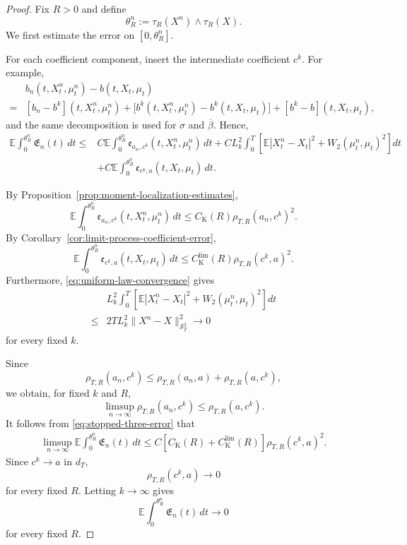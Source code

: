 \documentclass[12pt,oneside, reqno]{amsart}
\numberwithin{equation}{section}
\begin{document}
	\begin{proof}
		Fix $R>0$ and define
		\[
		\theta_R^n
		:=
		\tau_R(X^n)\wedge\tau_R(X).
		\]
		We first estimate the error on $[0,\theta_R^n]$.
		
		For each coefficient component, insert the intermediate coefficient
		$c^k$. For example,
		\[
		\begin{aligned}
			&
			b_n(t,X_t^n,\mu_t^n)-b(t,X_t,\mu_t)\\
			=&[b_n-b^k](t,X_t^n,\mu_t^n)+\bigl[	b^k(t,X_t^n,\mu_t^n)
			-b^k(t,X_t,\mu_t)\bigr]
			+[b^k-b](t,X_t,\mu_t),
		\end{aligned}
		\]
		and the same decomposition is used for $\sigma$ and
		$\overline\beta$. Hence,
		\begin{align}
			\mathbb E\int_0^{\theta_R^n}
			\mathfrak E_n(t)\,dt\leq&
			C\mathbb E\int_0^{\theta_R^n}
			\mathfrak e_{a_n,c^k}(t,X_t^n,\mu_t^n)\,dt
			+
			C L_k^2
			\int_0^T
			\left[
			\mathbb E|X_t^n-X_t|^2
			+
			W_2(\mu_t^n,\mu_t)^2
			\right]dt
			\nonumber\\
			&+
			C\mathbb E\int_0^{\theta_R^n}
			\mathfrak e_{c^k,a}(t,X_t,\mu_t)\,dt.
			\label{eq:stopped-three-error}
		\end{align}
		
		By Proposition~\ref{prop:moment-localization-estimates},
		\[
		\mathbb E\int_0^{\theta_R^n}
		\mathfrak e_{a_n,c^k}(t,X_t^n,\mu_t^n)\,dt
		\leq
		C_{\mathrm K}(R)
		\rho_{T,R}(a_n,c^k)^2.
		\]
		By Corollary~\ref{cor:limit-process-coefficient-error},
		\[
		\mathbb E\int_0^{\theta_R^n}
		\mathfrak e_{c^k,a}(t,X_t,\mu_t)\,dt
		\leq
		C_{\mathrm K}^{\mathrm{lim}}(R)
		\rho_{T,R}(c^k,a)^2.
		\]
		Furthermore, \eqref{eq:uniform-law-convergence} gives
		\[
		\begin{aligned}
			&
			L_k^2
			\int_0^T
			\left[
			\mathbb E|X_t^n-X_t|^2
			+
			W_2(\mu_t^n,\mu_t)^2
			\right]dt
			\\
			\leq&
			2TL_k^2
			\|X^n-X\|_{\mathcal S_T^2}^2
			\longrightarrow0
		\end{aligned}
		\]
		for every fixed $k$.
		
		Since
		\[
		\rho_{T,R}(a_n,c^k)
		\leq
		\rho_{T,R}(a_n,a)
		+
		\rho_{T,R}(a,c^k),
		\]
		we obtain, for fixed $k$ and $R$,
		\[
		\limsup_{n\to\infty}
		\rho_{T,R}(a_n,c^k)
		\leq
		\rho_{T,R}(a,c^k).
		\]
		It follows from \eqref{eq:stopped-three-error} that
		\[
		\begin{aligned}
			\limsup_{n\to\infty}
			\mathbb E\int_0^{\theta_R^n}
			\mathfrak E_n(t)\,dt
			\leq
			C\left[
			C_{\mathrm K}(R)
			+
			C_{\mathrm K}^{\mathrm{lim}}(R)
			\right]
			\rho_{T,R}(c^k,a)^2.
		\end{aligned}
		\]
		Since $c^k\to a$ in $d_T$,
		\[
		\rho_{T,R}(c^k,a)\longrightarrow0
		\]
		for every fixed $R$. Letting $k\to\infty$ gives
		\begin{equation}
			\label{eq:stopped-integrand-convergence}
			\mathbb E\int_0^{\theta_R^n}
			\mathfrak E_n(t)\,dt
			\longrightarrow0
		\end{equation}
		for every fixed $R$.
		

\end{proof}
\end{document}
